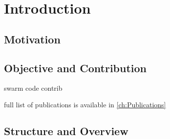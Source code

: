 
\chapter{Introduction}
\label{ch:Introduction}



\section{Motivation}
\label{ch:Introduction:sec:Motivation}


\section{Objective and Contribution}
\label{ch:Introduction:sec:ObjectiveContribution}

swarm code contrib \cite{Mahe2014,Mahe2015}

full list of publications is available in \ref{ch:Publications}


\section{Structure and Overview}
\label{ch:Introduction:sec:StructureOverview}
